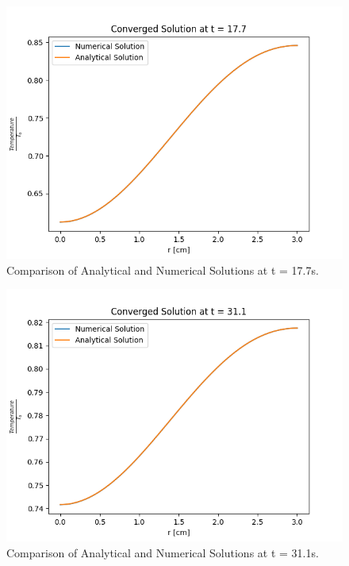 \documentclass[12pt,letterpaper]{article}
\begin{document}
\begin{figure}[htbp!]
  \begin{center}
    \includegraphics[scale=0.7]{conv_177s.png}
  \end{center}
  \caption{Comparison of Analytical and Numerical Solutions at t = 17.7s.}
  \label{fig:conv_177}
\end{figure}

\begin{figure}[htbp!]
  \begin{center}
    \includegraphics[scale=0.7]{conv_311s.png}
  \end{center}
  \caption{Comparison of Analytical and Numerical Solutions at t = 31.1s.}
  \label{fig:conv_311}
\end{figure}
\end{document}
